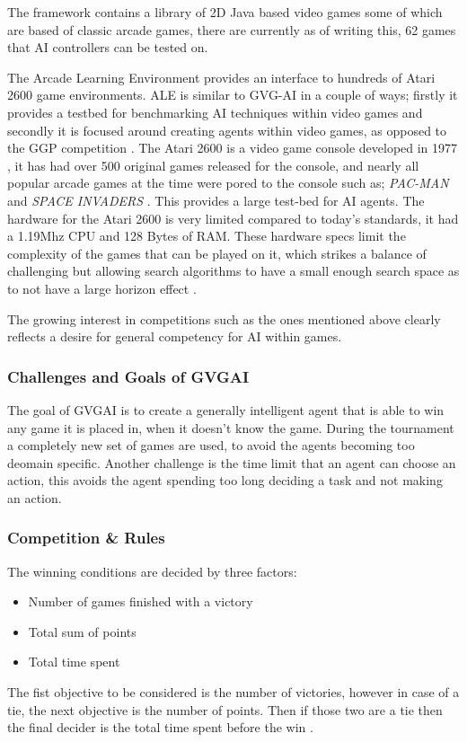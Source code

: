 \documentclass[journal]{IEEEtran}
\begin{document}
		The framework contains a library of 2D Java based video games some of which are based of classic arcade games, there are currently as of writing this, 62 games that AI controllers can be tested on.

		The Arcade Learning Environment \cite{bellemare2013arcade} provides an interface to hundreds of Atari 2600 game environments. ALE is similar to GVG-AI in a couple of ways; firstly it provides a testbed for benchmarking AI techniques within video games and secondly it is focused around creating agents within video games, as opposed to the GGP competition \cite{GGP2005general}.
		The Atari 2600 is a video game console developed in 1977 , it has had over 500 original games released for the console, and nearly all popular arcade games at the time were pored to the console such as; \textit{PAC-MAN} and \textit{SPACE INVADERS} \cite{bellemare2013arcade}. This provides a large test-bed for AI agents.
		The hardware for the Atari 2600 is very limited compared to today's standards, it had a 1.19Mhz CPU and 128 Bytes of RAM. These hardware specs limit the complexity of the games that can be played on it, which strikes a balance of challenging but allowing search algorithms to have a small enough search space as to not have a large horizon effect \cite{bellemare2013arcade}.
		
		The growing interest in competitions such as the ones mentioned above clearly reflects a desire for general competency for AI within games.

	\subsubsection{Challenges and Goals of GVGAI}
		The goal of GVGAI is to create a generally intelligent agent that is able to win any game it is placed in, when it doesn't know the game.
		During the tournament a completely new set of games are used, to avoid the agents becoming too deomain specific.
		Another challenge is the time limit that an agent can choose an action, this avoids the agent spending too long deciding a task and not making an action. \cite{schuster2015mcts}
		
		
	\subsubsection{Competition \& Rules}
	
		The winning conditions are decided by three factors:
		\begin{itemize}
		    \item Number of games finished with a victory
		    \item Total sum of points
		    \item Total time spent
		\end{itemize}
		The fist objective to be considered is the number of victories, however in case of a tie, the next objective is the number of points. Then if those two are a tie then the final decider is the total time spent before the win \cite{perez20162014}.
		
\end{document}
